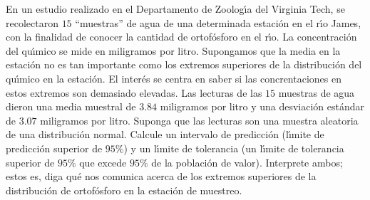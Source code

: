 \begin{enunciado}
 En un estudio realizado en el Departamento de Zoolog\'{\i}a del Virginia Tech, se recolectaron $15$ ``muestras'' de agua de una determinada estaci\'on en el r\'{\i}o James, con la finalidad de conocer la cantidad de ortof\'osforo en el r\'{\i}o. La concentraci\'on del qu\'{\i}mico se mide en miligramos por litro. Supongamos que la media en la estaci\'on no es tan importante como los extremos superiores de la distribuci\'on del qu\'{\i}mico en la estaci\'on. El inter\'es se centra en saber si las concrentaciones en estos extremos son demasiado elevadas. Las lecturas de las $15$ muestras de agua dieron una media muestral de $3.84$ miligramos por litro y una desviaci\'on est\'andar de $3.07$ miligramos por litro. Suponga que las lecturas son una muestra aleatoria de una distribuci\'on normal. Calcule un intervalo de predicci\'on (l\'{\i}mite de predicci\'on superior de $95\%$) y un l\'{\i}mite de tolerancia (un l\'{\i}mite de tolerancia superior de $95\%$ que excede $95\%$ de la poblaci\'on de valor). Interprete ambos; estos es, diga qu\'e nos comunica acerca de los extremos superiores de la distribuci\'on de ortof\'osforo en la estaci\'on de muestreo.
\end{enunciado}

